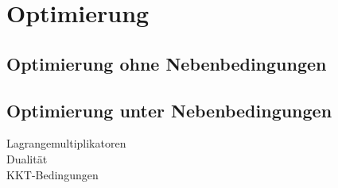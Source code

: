 \section{Optimierung}




\subsection{Optimierung ohne Nebenbedingungen}





\subsection{Optimierung unter Nebenbedingungen}
Lagrangemultiplikatoren\\
Dualität\\
KKT-Bedingungen